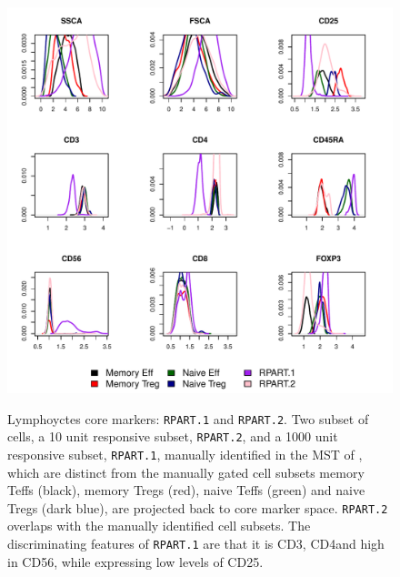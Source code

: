 \begin{figure}
\centering
\begin{minipage}{.8\textwidth}
\includegraphics[width=\linewidth]{figures/rpart-lymphocytes-clusters}
\end{minipage}
{  Lymphoyctes core markers: \texttt{RPART.1} and \texttt{RPART.2}.  }
{
 Two subset of cells, a 10 unit responsive subset, \texttt{RPART.2}, and a 1000 unit responsive subset, \texttt{RPART.1}, manually identified in the MST of , which are distinct from the manually gated cell subsets memory Teffs (black), memory Tregs (red), naive Teffs (green) and naive Tregs (dark blue), are projected back to core marker space.
 \texttt{RPART.2} overlaps with the manually identified cell subsets.
 The discriminating features of \texttt{RPART.1} are that it is CD3\negative, CD4\negative and high in CD56, while expressing low levels of CD25.
}
\end{figure}
